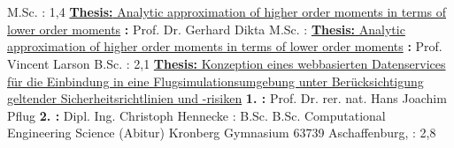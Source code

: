 \section{\education}\label{sec:education}
%
{M.Sc. \ami}
{\newline{}\fhac}
{\fhacloc}
{\newline{}\grade: 1,4}
{\href{https://github.com/svbergmann/Masterthesis/blob/master/out/Masterthesis.pdf}{\textbf{Thesis:} Analytic approximation of higher order moments in terms of lower order moments} \newline{} \textbf{\supervisor:} Prof. Dr. Gerhard Dikta}
%
{M.Sc. \mathematics}
{\newline{}\uwm}
{\uwmloc}
{\newline{}\grade: \uwmgrade}
{\href{https://github.com/svbergmann/Masterthesis/blob/master/out/Masterthesis.pdf}{\textbf{Thesis:} Analytic approximation of higher order moments in terms of lower order moments} \newline{} \textbf{\supervisor:} Prof. Vincent Larson}
%
{B.Sc. \ami}
{\newline{}\fhac}
{\fhacloc}
{\newline{}\grade: 2,1}
{\href{https://github.com/svbergmann/Bachelorarbeit/tree/master/out}{\textbf{Thesis:} Konzeption eines webbasierten Datenservices für die Einbindung in eine Flugsimulationsumgebung unter Berücksichtigung geltender Sicherheitsrichtlinien und -risiken} \newline{} \textbf{1. \supervisor:} Prof. Dr. rer. nat. Hans Joachim Pflug \newline{}\textbf{2. \supervisor:} Dipl. Ing. Christoph Hennecke}
%
{\matse}
{\newline{}\cae}
{\caeloc}
{\newline{}\grade: \satisfactory}
{} %
%
{B.Sc. \mechanicalengineering}
{\newline{}\rwthac}
{\rwthacloc}
{\newline{}\withoutdegree}
{} %
%
{B.Sc. Computational Engineering Science}
{\newline{}\rwthac}
{\rwthacloc}
{\newline{}\withoutdegree}
{} %
%
{\highschooldiploma (Abitur)}
{\newline{}Kronberg Gymnasium}
{63739 Aschaffenburg, \germany}
{\newline{}\grade: 2,8}
{} %